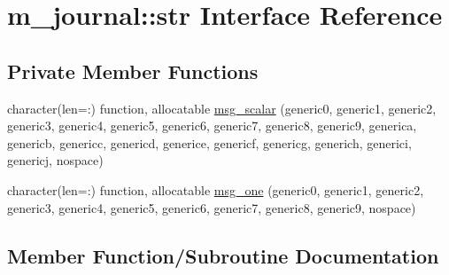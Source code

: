 \hypertarget{interfacem__journal_1_1str}{}\section{m\+\_\+journal\+:\+:str Interface Reference}
\label{interfacem__journal_1_1str}
\subsection*{Private Member Functions}
\begin{DoxyCompactItemize}
\item 
character(len=\+:) function, allocatable \mbox{\hyperlink{interfacem__journal_1_1str_a69189d3260fdc40375cdf1c06a8ecfd8}{msg\+\_\+scalar}} (generic0, generic1, generic2, generic3, generic4, generic5, generic6, generic7, generic8, generic9, generica, genericb, genericc, genericd, generice, genericf, genericg, generich, generici, genericj, nospace)
\item 
character(len=\+:) function, allocatable \mbox{\hyperlink{interfacem__journal_1_1str_ab815e85db660fe93eb0bc114e441710b}{msg\+\_\+one}} (generic0, generic1, generic2, generic3, generic4, generic5, generic6, generic7, generic8, generic9, nospace)
\end{DoxyCompactItemize}


\subsection{Member Function/\+Subroutine Documentation}
\mbox{\label{interfacem__journal_1_1str_ab815e85db660fe93eb0bc114e441710b}} 
